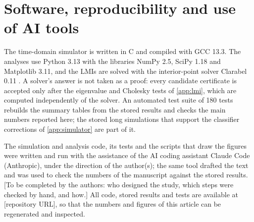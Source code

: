 \section{Software, reproducibility and use of AI tools}\label{app:software}

The time-domain simulator is written in C and compiled with GCC 13.3. The analyses use Python 3.13 with the libraries NumPy 2.5, SciPy 1.18 and Matplotlib 3.11, and the LMIs are solved with the interior-point solver Clarabel 0.11 \citep{goulart2024clarabel}. A solver's answer is not taken as a proof: every candidate certificate is accepted only after the eigenvalue and Cholesky tests of \ref{app:lmi}, which are computed independently of the solver. An automated test suite of 180 tests rebuilds the summary tables from the stored results and checks the main numbers reported here; the stored long simulations that support the classifier corrections of \ref{app:simulator} are part of it.

The simulation and analysis code, its tests and the scripts that draw the figures were written and run with the assistance of the AI coding assistant Claude Code (Anthropic), under the direction of the author(s); the same tool drafted the text and was used to check the numbers of the manuscript against the stored results. [To be completed by the authors: who designed the study, which steps were checked by hand, and how.] All code, stored results and tests are available at [repository URL], so that the numbers and figures of this article can be regenerated and inspected.
